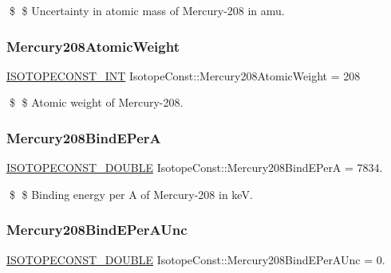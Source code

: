 \$ \$ Uncertainty in atomic mass of Mercury-\/208 in amu. \mbox{\label{group___isotope_const-_mercury-_hg208_gab5b14dbcb23d0836d9934167d81843b8}} 
\subsubsection{\texorpdfstring{Mercury208\+Atomic\+Weight}{Mercury208AtomicWeight}}
{\footnotesize\ttfamily \mbox{\hyperlink{group___isotope_const-_macros_ga5f18360b3e99483a35c32d789e62621c}{I\+S\+O\+T\+O\+P\+E\+C\+O\+N\+S\+T\+\_\+\+I\+NT}} Isotope\+Const\+::\+Mercury208\+Atomic\+Weight = 208}

\$ \$ Atomic weight of Mercury-\/208. \mbox{\label{group___isotope_const-_mercury-_hg208_ga5d8bf7f1700ebe780c9085f1fe4759fa}} 
\subsubsection{\texorpdfstring{Mercury208\+Bind\+E\+PerA}{Mercury208BindEPerA}}
{\footnotesize\ttfamily \mbox{\hyperlink{group___isotope_const-_macros_ga8f45a7272ce02c0b4c65c44636ed719a}{I\+S\+O\+T\+O\+P\+E\+C\+O\+N\+S\+T\+\_\+\+D\+O\+U\+B\+LE}} Isotope\+Const\+::\+Mercury208\+Bind\+E\+PerA = 7834.}

\$ \$ Binding energy per A of Mercury-\/208 in keV. \mbox{\label{group___isotope_const-_mercury-_hg208_ga69f025d98072827e9f3758840999c94f}} 
\subsubsection{\texorpdfstring{Mercury208\+Bind\+E\+Per\+A\+Unc}{Mercury208BindEPerAUnc}}
{\footnotesize\ttfamily \mbox{\hyperlink{group___isotope_const-_macros_ga8f45a7272ce02c0b4c65c44636ed719a}{I\+S\+O\+T\+O\+P\+E\+C\+O\+N\+S\+T\+\_\+\+D\+O\+U\+B\+LE}} Isotope\+Const\+::\+Mercury208\+Bind\+E\+Per\+A\+Unc = 0.}

